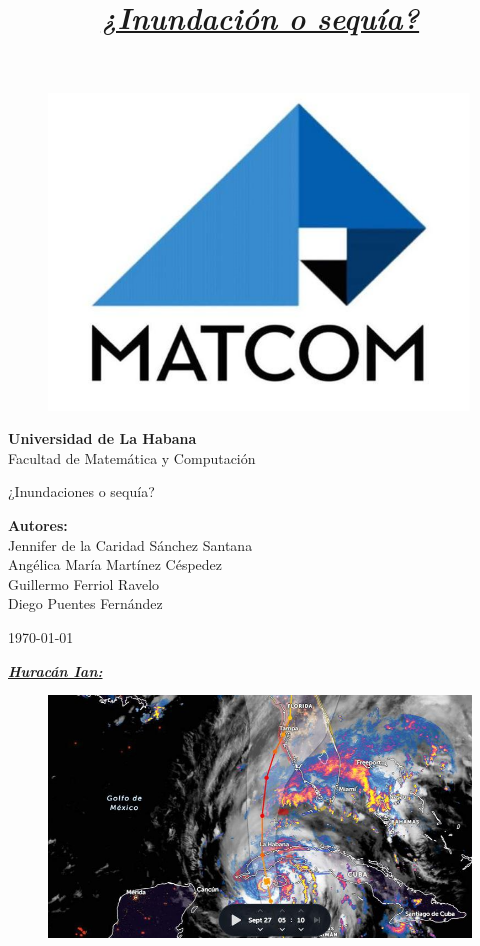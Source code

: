 \documentclass[12pt]{article}
\title{\textbf{\textit{\underline{¿Inundación o sequía?}}}}
\begin{document}
	
\begin{titlepage}
	\centering
	\vspace*{1cm}
	\begin{figure}
		\centering
		\includegraphics[width=0.3\linewidth]{images/logo}
		\label{fig:logo}
	\end{figure}
	
	\large{\textbf{Universidad de La Habana}\\
	Facultad de Matemática y Computación\\}
	\vspace{3.5cm}
	
	{\rmfamily\selectfont\Huge{¿Inundaciones o sequía?}} 
	\vspace{1.5cm}
	
	\Large
	\vspace{2 cm}
	\normalsize{\textbf{Autores:}\\
		Jennifer de la Caridad Sánchez Santana\\
		Angélica María Martínez Céspedez\\
		Guillermo Ferriol Ravelo\\
		Diego Puentes Fernández\\}
	\vfill
	
	\large
	\today
\end{titlepage}

	
	\begin{center}
		\textbf{\textit{\underline{{\fontsize{60}{24}\selectfont Huracán Ian:}}}}
	\end{center}
	
	
	\begin{figure}[H]
		\centering
		\includegraphics[width=0.7\linewidth]{./Report/images/Ian}
		\label{fig:ian}
	\end{figure}
	
\end{document}
